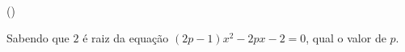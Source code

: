 \begin{question}[type=exam] () %

Sabendo que $2$ é raiz da equação $(2p-1)x^2 -2px-2=0$, qual o valor de $p$.

\end{question}